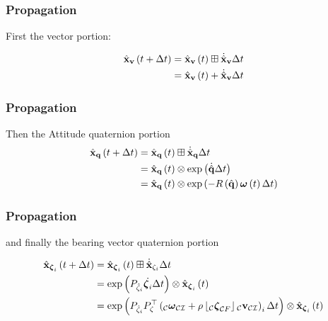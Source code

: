 \documentclass{beamer}
\begin{document}
\begin{frame}
\frametitle{Propagation}
First the vector portion:

\begin{align}
\hat{{\bf x}}_{{\bf v}}\left(t+\Delta t\right) & =\hat{{\bf x}}_{{\bf v}}\left(t\right)\boxplus\dot{\hat{{\bf x}}}_{{\bf v}}\Delta t\\
 & =\hat{{\bf x}}_{{\bf v}}\left(t\right)+\dot{\hat{{\bf x}}}_{{\bf v}}\Delta t
\end{align}
\end{frame}


\begin{frame}
\frametitle{Propagation}
Then the Attitude quaternion portion 
\begin{align}
\hat{{\bf x}}_{{\bf q}}\left(t+\Delta t\right) & =\hat{{\bf x}}_{{\bf q}}\left(t\right)\boxplus\dot{\hat{{\bf x}}}_{{\bf q}}\Delta t\\
 & =\hat{{\bf x}}_{{\bf q}}\left(t\right)\otimes\exp\left(\dot{\hat{{\bf q}}}\Delta t\right)\\
 & =\hat{{\bf x}}_{{\bf q}}\left(t\right)\otimes\exp\left(-R\left(\hat{{\bf q}}\right)\boldsymbol{\omega}\left(t\right)\Delta t\right)
\end{align}
\end{frame}


\begin{frame}
\frametitle{Propagation}
and finally the bearing vector quaternion portion

\begin{align}
\hat{{\bf x}}_{\boldsymbol{\zeta}_{i}}\left(t+\Delta t\right) & =\hat{{\bf x}}_{\boldsymbol{\zeta}_{i}}\left(t\right)\boxplus\dot{\hat{{\bf x}}}_{\zeta_{i}}\Delta t\\
 & =\exp\left(P_{\hat{\zeta}_{i}}\dot{\boldsymbol{\zeta}_{i}}\Delta t\right)\otimes\hat{{\bf x}}_{\boldsymbol{\zeta}_{i}}\left(t\right)\\
 & =\exp\left(P_{\hat{\zeta}_{i}}P_{\zeta}^{\top}\left(_{\mathcal{C}}\boldsymbol{\omega}_{\mathcal{C}\mathcal{I}}+\rho\left\lfloor _{\mathcal{C}}\boldsymbol{\zeta}_{\mathcal{C}F}\right\rfloor {}_{\mathcal{C}}{\bf v}_{\mathcal{C}\mathcal{I}}\right)_{i}\Delta t\right)\otimes\hat{{\bf x}}_{\boldsymbol{\zeta}_{i}}\left(t\right)
\end{align}
\end{frame}
\end{document}
